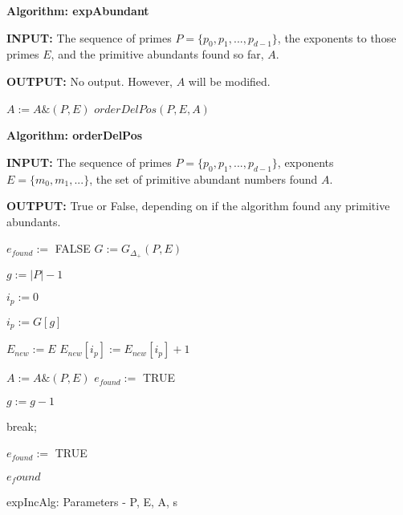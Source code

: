 \documentclass[../paper.tex]{subfiles}
\begin{document}
{\setlength{\parindent}{0cm}

\textbf{Algorithm: expAbundant}

\textbf{INPUT:} The sequence of primes 
$P = \{p_0, p_1, ..., p_{d-1}\}$, the exponents to those 
primes $E$, and the primitive abundants found so far, $A$.

\textbf{OUTPUT:} No output. However, $A$ will be modified.
}

\begin{algorithmic}
		\STATE $A := A \& (P,E)$
		\RETURN
	\ENDIF
	\RETURN
\ENDIF
$orderDelPos(P,E,A)$
\RETURN

\end{algorithmic}

{\setlength{\parindent}{0cm}

\textbf{Algorithm: orderDelPos}

\textbf{INPUT:} The sequence of primes 
$P = \{p_0, p_1, ..., p_{d-1}\}$, exponents $E = \{ m_0, m_1,
...\}$, the set of primitive abundant numbers found $A$.

\textbf{OUTPUT:} True or False, depending on if the algorithm found any primitive abundants.
}


\begin{algorithmic}

\STATE $e_{found} :=$ FALSE
\STATE $G := G_{ \Delta_{+}}(P,E)$

\STATE $g := |P| - 1$ %

\STATE $i_p := 0$ %

	\STATE $i_p := G[g]$


		\STATE {}
		\STATE $E_{new} := E$
		\STATE $E_{new}[ i_p ] := E_{new}[ i_p ] + 1 $
		
			\STATE $A := A\&(P,E)$
			\STATE $e_{found} := $ TRUE
		\ENDIF

		\STATE $g := g - 1$  
	
	\ELSE
		\STATE break;
	\ENDIF
\ENDWHILE


	\STATE {}
		\STATE $e_{found} := $ TRUE
	\ENDIF
\ENDIF

\RETURN $e_found$

\end{algorithmic}
expIncAlg: Parameters - P, E, A, s
\end{document}
